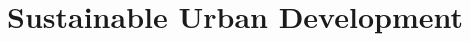 \documentclass[../main]{subfiles}
\begin{document}
\section{Sustainable Urban Development}
\end{document}
